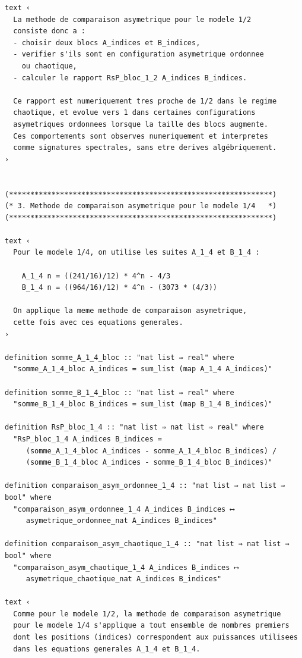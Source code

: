 \documentclass[a4paper,11pt]{article}
\begin{document}
\begin{holcode}[title={\textcolor{white}{Fichier : methode\_spectral.thy -- Partie 1/4}}]
\begin{lstlisting}
text ‹
  La methode de comparaison asymetrique pour le modele 1/2
  consiste donc a :
  - choisir deux blocs A_indices et B_indices,
  - verifier s'ils sont en configuration asymetrique ordonnee
    ou chaotique,
  - calculer le rapport RsP_bloc_1_2 A_indices B_indices.

  Ce rapport est numeriquement tres proche de 1/2 dans le regime
  chaotique, et evolue vers 1 dans certaines configurations
  asymetriques ordonnees lorsque la taille des blocs augmente.
  Ces comportements sont observes numeriquement et interpretes
  comme signatures spectrales, sans etre derives algébriquement.
›


(**************************************************************)
(* 3. Methode de comparaison asymetrique pour le modele 1/4   *)
(**************************************************************)

text ‹
  Pour le modele 1/4, on utilise les suites A_1_4 et B_1_4 :

    A_1_4 n = ((241/16)/12) * 4^n - 4/3
    B_1_4 n = ((964/16)/12) * 4^n - (3073 * (4/3))

  On applique la meme methode de comparaison asymetrique,
  cette fois avec ces equations generales.
›

definition somme_A_1_4_bloc :: "nat list ⇒ real" where
  "somme_A_1_4_bloc A_indices = sum_list (map A_1_4 A_indices)"

definition somme_B_1_4_bloc :: "nat list ⇒ real" where
  "somme_B_1_4_bloc B_indices = sum_list (map B_1_4 B_indices)"

definition RsP_bloc_1_4 :: "nat list ⇒ nat list ⇒ real" where
  "RsP_bloc_1_4 A_indices B_indices =
     (somme_A_1_4_bloc A_indices - somme_A_1_4_bloc B_indices) /
     (somme_B_1_4_bloc A_indices - somme_B_1_4_bloc B_indices)"

definition comparaison_asym_ordonnee_1_4 :: "nat list ⇒ nat list ⇒ bool" where
  "comparaison_asym_ordonnee_1_4 A_indices B_indices ⟷
     asymetrique_ordonnee_nat A_indices B_indices"

definition comparaison_asym_chaotique_1_4 :: "nat list ⇒ nat list ⇒ bool" where
  "comparaison_asym_chaotique_1_4 A_indices B_indices ⟷
     asymetrique_chaotique_nat A_indices B_indices"

text ‹
  Comme pour le modele 1/2, la methode de comparaison asymetrique
  pour le modele 1/4 s'applique a tout ensemble de nombres premiers
  dont les positions (indices) correspondent aux puissances utilisees
  dans les equations generales A_1_4 et B_1_4.


\end{lstlisting}
\end{holcode}
\end{document}
